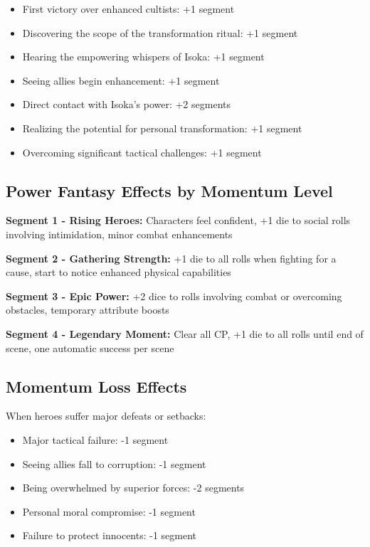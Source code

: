 \documentclass[12pt,twoside]{article}
\begin{document}
\begin{itemize}
  \item First victory over enhanced cultists: +1 segment
  \item Discovering the scope of the transformation ritual: +1 segment
  \item Hearing the empowering whispers of Isoka: +1 segment
  \item Seeing allies begin enhancement: +1 segment
  \item Direct contact with Isoka's power: +2 segments
  \item Realizing the potential for personal transformation: +1 segment
  \item Overcoming significant tactical challenges: +1 segment
\end{itemize}

\subsection{Power Fantasy Effects by Momentum Level}

\textbf{Segment 1 - Rising Heroes:} Characters feel confident, +1 die to social rolls involving intimidation, minor combat enhancements

\textbf{Segment 2 - Gathering Strength:} +1 die to all rolls when fighting for a cause, start to notice enhanced physical capabilities

\textbf{Segment 3 - Epic Power:} +2 dice to rolls involving combat or overcoming obstacles, temporary attribute boosts

\textbf{Segment 4 - Legendary Moment:} Clear all CP, +1 die to all rolls until end of scene, one automatic success per scene

\subsection{Momentum Loss Effects}

When heroes suffer major defeats or setbacks:
\begin{itemize}
  \item Major tactical failure: -1 segment
  \item Seeing allies fall to corruption: -1 segment
  \item Being overwhelmed by superior forces: -2 segments
  \item Personal moral compromise: -1 segment
  \item Failure to protect innocents: -1 segment
\end{itemize}
\end{document}
